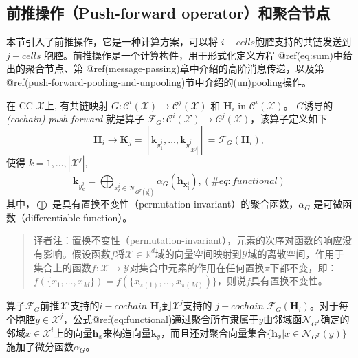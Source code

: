 \documentclass[
  12pt,
]{krantz}
\begin{document}
\subsection{前推操作（Push-forward
operator）和聚合节点}\label{push-forward-operator-and-merge-node}

本节引入了前推操作，它是一种计算方案，可以将
\(i-cells\)胞腔支持的共链发送到 \(j-cells\)
胞腔。前推操作是一个计算构件，用于形式化定义方程
@ref(eq:sum)中给出的聚合节点、第
@ref(message-passing)章中介绍的高阶消息传递，以及第
@ref(push-forward-pooling-and-unpooling)节中介绍的(un)pooling操作。

\label{pushing-exact-definition}
在 CC \(\mathcal{X}\)上, 有共链映射
\(G\colon\mathcal{C}^i(\mathcal{X})\to \mathcal{C}^j(\mathcal{X})\) 和
\(\mathbf{H}_i\) in \(\mathcal{C}^i(\mathcal{X})\)。
\(G\)诱导的\emph{(cochain) push-forward} 就是算子
\(\mathcal{F}_G \colon \mathcal{C}^i(\mathcal{X})\to \mathcal{C}^j(\mathcal{X})\)，该算子定义如下
\begin{equation}
\mathbf{H}_i \to \mathbf{K}_j=[ \mathbf{k}_{y^j_1},\ldots,\mathbf{k}_{y^j_{|\mathcal{X}^j|} }] = \mathcal{F}_G(\mathbf{H}_i),
\end{equation} 使得 \(k=1,\ldots,|\mathcal{X}^j|\), \begin{equation}
\mathbf{k}_{y_k^j}= \bigoplus_{x_l^i \in \mathcal{N}_{G^T(y_k^j)}} \alpha_{G} ( \mathbf{ \mathbf{h}_{x_l^i}}),
(\#eq:functional)
\end{equation} 其中，\(\bigoplus\)
是具有置换不变性（permutation-invariant）的聚合函数，\(\alpha_G\)
是可微函数（differentiable function）。

\begin{quote}
译者注：置换不变性（permutation-invariant），元素的次序对函数的响应没有影响。假设函数\(f\)将\(\mathcal{X}\in \mathbb{R}^{d}\)域的向量空间映射到\(\mathcal{Y}\)域的离散空间，作用于集合上的函数\(f:\mathcal{X}\rightarrow \mathcal{Y}\)对集合中元素的作用在任何置换\(\pi\)下都不变，即：\(f(\{x_{1},\ldots,x_{M}\})=f(\{x_{\pi(1)},\ldots,x_{\pi(M)})\}\)，则说\(f\)具有置换不变性。
\end{quote}

算子\(\mathcal{F}_{G}\)前推\(\mathcal{X}^i\)支持的\(i-cochain\)
\(\mathbf{H}_i\)到\(\mathcal{X}^j\)支持的 \(j-cochain\)
\(\mathcal{F}_{G}(\mathbf{H}_i)\)。对于每个胞腔\(y \in \mathcal{X}^j\)，公式@ref(eq:functional)通过聚合所有隶属于\(y\)由邻域函\(\mathcal{N}_{G^T}\)确定的邻域\(x \in \mathcal{X}^i\)上的向量\(\mathbf{h}_x\)来构造向量\(\mathbf{k}_y\)，而且还对聚合向量集合\(\{ \mathbf{h}_x| x\in \mathcal{N}_{G^T}(y)\}\)施加了微分函数\(\alpha_G\)。
\end{document}
